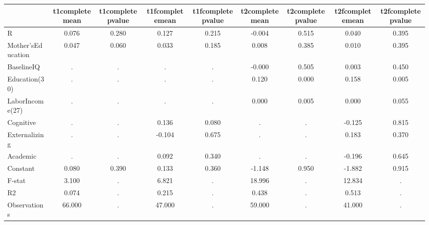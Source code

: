 \begin{table}[htbp]
\begin{tabular}{lcccccccc} \hline \hline
 & t1completemean  & t1completepvalue  & t1fcompletemean  & t1fcompletepvalue  & t2completemean  & t2completepvalue  & t2fcompletemean  & t2fcompletepvalue  \\  \hline 
R &     0.076 &     0.280 &     0.127 &     0.215 &    -0.004 &     0.515 &     0.040 &     0.395 \\  
Mother'sEducation &     0.047 &     0.060 &     0.033 &     0.185 &     0.008 &     0.385 &     0.010 &     0.395 \\  
BaselineIQ &         . &         . &         . &         . &    -0.000 &     0.505 &     0.003 &     0.450 \\  
Education(30) &         . &         . &         . &         . &     0.120 &     0.000 &     0.158 &     0.005 \\  
LaborIncome(27) &         . &         . &         . &         . &     0.000 &     0.005 &     0.000 &     0.055 \\  
Cognitive &         . &         . &     0.136 &     0.080 &         . &         . &    -0.125 &     0.815 \\  
Externalizing &         . &         . &    -0.104 &     0.675 &         . &         . &     0.183 &     0.370 \\  
Academic &         . &         . &     0.092 &     0.340 &         . &         . &    -0.196 &     0.645 \\  
Constant &     0.080 &     0.390 &     0.133 &     0.360 &    -1.148 &     0.950 &    -1.882 &     0.915 \\  
F-stat &     3.100 &         . &     6.821 &         . &    18.996 &         . &    12.834 &         . \\  
R2 &     0.074 &         . &     0.215 &         . &     0.438 &         . &     0.513 &         . \\  
Observations &    66.000 &         . &    47.000 &         . &    59.000 &         . &    41.000 &         . \\  
\hline \hline \end{tabular}
\end{table}
